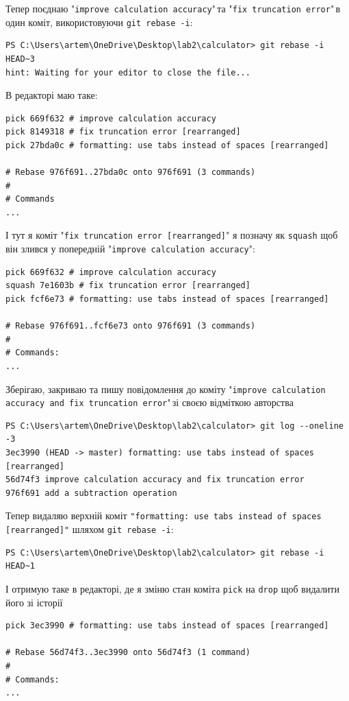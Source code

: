 \documentclass[12pt,a4paper]{article}
\begin{document}
    Тепер поєднаю "\texttt{improve calculation accuracy}"\,та "\texttt{fix truncation error}"\,в один коміт, використовуючи \texttt{git rebase -i}:

    \begin{verbatim}
PS C:\Users\artem\OneDrive\Desktop\lab2\calculator> git rebase -i HEAD~3
hint: Waiting for your editor to close the file...
    \end{verbatim}

    В редакторі маю таке:
    \begin{verbatim}
pick 669f632 # improve calculation accuracy
pick 8149318 # fix truncation error [rearranged]
pick 27bda0c # formatting: use tabs instead of spaces [rearranged]

# Rebase 976f691..27bda0c onto 976f691 (3 commands)
#
# Commands
...
    \end{verbatim}

    І тут я коміт "\texttt{fix truncation error [rearranged]}" я позначу як \texttt{squash} щоб він злився у попередній
    "\texttt{improve calculation accuracy}":
    \begin{verbatim}
pick 669f632 # improve calculation accuracy
squash 7e1603b # fix truncation error [rearranged]
pick fcf6e73 # formatting: use tabs instead of spaces [rearranged]

# Rebase 976f691..fcf6e73 onto 976f691 (3 commands)
#
# Commands:
...
    \end{verbatim}

    Зберігаю, закриваю та пишу повідомлення до коміту "\texttt{improve calculation accuracy and fix truncation error}"\,зі своєю відміткою авторства
\begin{verbatim}
PS C:\Users\artem\OneDrive\Desktop\lab2\calculator> git log --oneline -3
3ec3990 (HEAD -> master) formatting: use tabs instead of spaces [rearranged]
56d74f3 improve calculation accuracy and fix truncation error
976f691 add a subtraction operation
    \end{verbatim}

    Тепер видаляю верхній коміт \texttt{"formatting: use tabs instead of spaces [rearranged]"} шляхом \texttt{git rebase -i}:

    \begin{verbatim}
PS C:\Users\artem\OneDrive\Desktop\lab2\calculator> git rebase -i HEAD~1
    \end{verbatim}

    І отримую таке в редакторі, де я зміню стан коміта \texttt{pick} на \texttt{drop} щоб видалити його зі історії
    \begin{verbatim}
pick 3ec3990 # formatting: use tabs instead of spaces [rearranged]

# Rebase 56d74f3..3ec3990 onto 56d74f3 (1 command)
#
# Commands:
...
    \end{verbatim}
\end{document}
